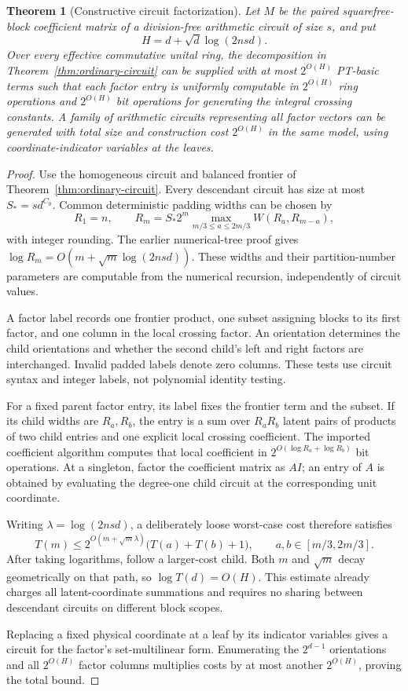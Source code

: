 \documentclass[11pt]{article}
\newtheorem{theorem}{Theorem}[section]
\theoremstyle{definition}
\theoremstyle{remark}
\begin{document}
\begin{theorem}[Constructive circuit factorization]
\label{thm:constructive-circuit}
Let $M$ be the paired squarefree-block coefficient matrix
of a division-free arithmetic circuit of size $s$, and put
\[
 H=d+\sqrt d\log(2nsd).
\]
Over every effective commutative unital ring, the decomposition
in Theorem~\ref{thm:ordinary-circuit} can be supplied with
at most $2^{O(H)}$ PT-basic terms such that each factor
entry is uniformly computable in $2^{O(H)}$ ring operations
and $2^{O(H)}$ bit operations for generating the integral
crossing constants.  A family of arithmetic circuits
representing all factor vectors can be generated with
total size and construction cost $2^{O(H)}$ in the same
model, using coordinate-indicator variables at the leaves.
\end{theorem}

\begin{proof}
Use the homogeneous circuit and balanced frontier of
Theorem~\ref{thm:ordinary-circuit}.  Every descendant
circuit has size at most $S_*=s d^{C_0}$.  Common deterministic
padding widths can be chosen by
\[
 R_1=n,\qquad
 R_m=S_*2^m
      \max_{m/3\le a\le2m/3}W(R_a,R_{m-a}),
\]
with integer rounding.  The earlier numerical-tree proof
gives
$\log R_m=O(m+\sqrt m\log(2nsd))$.
These widths and their partition-number parameters are
computable from the numerical recursion, independently of
circuit values.

A factor label records one frontier product, one subset
assigning blocks to its first factor, and one column in
the local crossing factor.  An orientation determines
the child orientations and whether the second child's
left and right factors are interchanged.  Invalid padded
labels denote zero columns.  These tests use circuit
syntax and integer labels, not polynomial identity testing.

For a fixed parent factor entry, its label fixes the
frontier term and the subset.  If its child widths are
$R_a,R_b$, the entry is a sum over $R_aR_b$ latent pairs
of products of two child entries and one explicit local
crossing coefficient.  The imported coefficient algorithm
computes that local coefficient in
$2^{O(\log R_a+\log R_b)}$ bit operations.  At a singleton,
factor the coefficient matrix as $A I$; an entry of $A$
is obtained by evaluating the degree-one child circuit at
the corresponding unit coordinate.

Writing $\lambda=\log(2nsd)$, a deliberately loose
worst-case cost therefore satisfies
\[
 T(m)\le 2^{O(m+\sqrt m\lambda)}
                   \bigl(T(a)+T(b)+1\bigr),
 \qquad a,b\in[m/3,2m/3].
\]
After taking logarithms, follow a larger-cost child.
Both $m$ and $\sqrt m$ decay geometrically on that path,
so $\log T(d)=O(H)$.  This estimate already charges all
latent-coordinate summations and requires no sharing
between descendant circuits on different block scopes.

Replacing a fixed physical coordinate at a leaf by its
indicator variables gives a circuit for the factor's
set-multilinear form.  Enumerating the $2^{d-1}$ orientations
and all $2^{O(H)}$ factor columns multiplies costs by at
most another $2^{O(H)}$, proving the total bound.
\end{proof}
\end{document}
